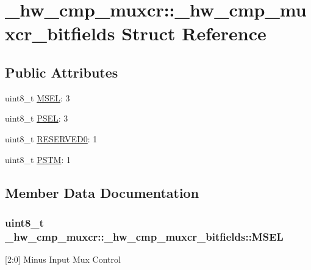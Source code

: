 \hypertarget{struct__hw__cmp__muxcr_1_1__hw__cmp__muxcr__bitfields}{}\section{\+\_\+hw\+\_\+cmp\+\_\+muxcr\+:\+:\+\_\+hw\+\_\+cmp\+\_\+muxcr\+\_\+bitfields Struct Reference}
\label{struct__hw__cmp__muxcr_1_1__hw__cmp__muxcr__bitfields}
\subsection*{Public Attributes}
\begin{DoxyCompactItemize}
\item 
uint8\+\_\+t \hyperlink{struct__hw__cmp__muxcr_1_1__hw__cmp__muxcr__bitfields_a2bcb16812411adbe7b11464dc077cd90}{M\+S\+EL}\+: 3
\item 
uint8\+\_\+t \hyperlink{struct__hw__cmp__muxcr_1_1__hw__cmp__muxcr__bitfields_a5d15cf4186a08fc572b766e07a2f8fab}{P\+S\+EL}\+: 3
\item 
uint8\+\_\+t \hyperlink{struct__hw__cmp__muxcr_1_1__hw__cmp__muxcr__bitfields_a35929ee45d01a4a4afcc1fdfbd811720}{R\+E\+S\+E\+R\+V\+E\+D0}\+: 1
\item 
uint8\+\_\+t \hyperlink{struct__hw__cmp__muxcr_1_1__hw__cmp__muxcr__bitfields_a26a2321b41b41543f34b328746ea11c1}{P\+S\+TM}\+: 1
\end{DoxyCompactItemize}


\subsection{Member Data Documentation}
\subsubsection[{\texorpdfstring{M\+S\+EL}{MSEL}}]{\setlength{\rightskip}{0pt plus 5cm}uint8\+\_\+t \+\_\+hw\+\_\+cmp\+\_\+muxcr\+::\+\_\+hw\+\_\+cmp\+\_\+muxcr\+\_\+bitfields\+::\+M\+S\+EL}\hypertarget{struct__hw__cmp__muxcr_1_1__hw__cmp__muxcr__bitfields_a2bcb16812411adbe7b11464dc077cd90}{}\label{struct__hw__cmp__muxcr_1_1__hw__cmp__muxcr__bitfields_a2bcb16812411adbe7b11464dc077cd90}
\mbox{[}2\+:0\mbox{]} Minus Input Mux Control 
